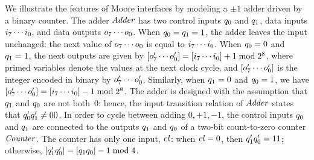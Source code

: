 \begin{examp}{}
We illustrate the features of Moore interfaces by modeling 
a $\pm 1$ adder driven by a binary counter.
The adder ${\text{\textit{Adder}}}$ has two control inputs $q_0$ and $q_1$, data inputs 
$i_7 \cdots i_0$, and data outputs $o_7 \cdots o_0$. 
When $q_0 = q_1 = 1$, the adder leaves the input unchanged: 
%
the next value of $o_7 \cdots o_0$ is equal to $i_7 \cdots i_0$.
When $q_0 = 0$ and $q_1 = 1$, the next outputs are given by 
$[o'_7 \cdots o'_0] = [i_7 \cdots i_0] + 1 \;{\text{\textrm{mod}}}\; 2^8$, where primed
variables denote the values at the next clock cycle, and
$[o'_7 \cdots o'_0]$ is the integer encoded in binary by 
$o'_7 \cdots o'_0$. 
%
%
Similarly, when $q_1 = 0$ and $q_0 = 1$, we have 
$[o'_7 \cdots o'_0] = [i_7 \cdots i_0] - 1 \;{\text{\textrm{mod}}}\; 2^8$. 
The adder is designed with the assumption that $q_1$ and $q_0$
are not both~$0$: hence, the input transition
relation of ${\text{\textit{Adder}}}$ states that $q_0' q_1' \neq 00$.
In order to cycle between adding $0, +1, -1$, the control
inputs $q_0$ and $q_1$ are connected to the outputs
$q_1$ and $q_0$ of a two-bit count-to-zero counter ${\text{\textit{Counter}}}$. 
The counter has only one input, ${\text{\textit{cl}}}$: 
when ${\text{\textit{cl}}} = 0$, then $q'_1 q'_0 = 11$; otherwise, 
$[q'_1 q'_0] = [q_1 q_0] - 1 \;{\text{\textrm{mod}}}\; 4$. 


\end{examp}
